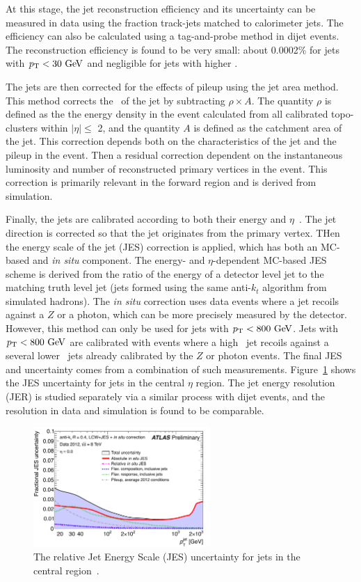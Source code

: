At this stage, the jet reconstruction efficiency and its uncertainty can be measured in data using the fraction track-jets matched to calorimeter jets. The efficiency can also be calculated using a tag-and-probe method in dijet events. The reconstruction efficiency is found to be very small: about 0.0002\% for jets with $\pt< 30 \gev$ and negligible for jets with higher \pt.

The jets are then corrected for the effects of pileup using the jet area method. This method corrects the \pt\ of the jet by subtracting $\rho\times A$. The quantity $\rho$ is defined as the  the energy density in the event calculated from all calibrated topo-clusters within $|\eta|\leq$ 2, and the quantity $A$ is defined as the catchment area of the jet. This correction depends both on the characteristics of the jet and the pileup in the event. Then a residual correction dependent on the instantaneous luminosity and number of reconstructed primary vertices in the event. This correction is primarily relevant in the forward region and is derived from simulation.

Finally, the jets are calibrated according to both their energy and $\eta$~\cite{JES}. The jet direction is corrected so that the jet originates from the primary vertex. THen the energy scale of the jet (JES) correction is applied, which has both an MC-based and \emph{in situ} component. The energy- and $\eta$-dependent MC-based JES scheme is derived from the ratio of the energy of a detector level jet to the matching truth level jet (jets formed using the same anti-$k_t$ algorithm from simulated hadrons). The \emph{in situ} correction uses data events where a jet recoils against a $Z$ or a photon, which can be more precisely measured by the detector. However, this method can only be used for jets with $\pt<800 \gev$. Jets with $\pt<800 \gev$ are calibrated with events where a high \pt\ jet recoils against a several lower \pt\ jets already calibrated by the $Z$ or photon events. The final JES and uncertainty comes from a combination of such measurements. Figure~\ref{fig:jesex} shows the JES uncertainty for jets in the central $\eta$ region. The jet energy resolution (JER) is studied separately via a similar process with dijet events, and the resolution in data and simulation is found to be comparable.

\begin{figure}[hp]
\centering
\includegraphics[width=0.6\textwidth]{fig/obj/smalljesunc.pdf}
\caption{The relative Jet Energy Scale (JES) uncertainty for jets in the central region~\cite{JES}.}
\label{fig:jesex}
\end{figure}

